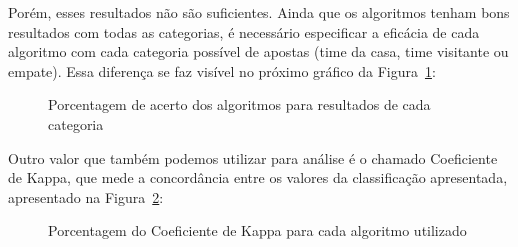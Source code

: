 \documentclass[thesis]{hmcposter}
\begin{document}
\begin{poster}
Porém, esses resultados não são suficientes. Ainda que os algoritmos tenham bons resultados com todas as categorias, é necessário especificar a eficácia de cada algoritmo com cada categoria possível de apostas (time da casa, time visitante ou empate). Essa diferença se faz visível no próximo gráfico da Figura~\ref{fig:algoritmo-categoria}:

\begin{figure}
\begin{center}
\caption{Porcentagem de acerto dos algoritmos para resultados de cada categoria}%
\label{fig:algoritmo-categoria}
\end{center}
\end{figure}

Outro valor que também podemos utilizar para análise é o chamado Coeficiente de Kappa, que mede a concordância entre os valores da classificação apresentada, apresentado na Figura~\ref{fig:algoritmo-kappa}:

\begin{figure}
\begin{center}
\caption{Porcentagem do Coeficiente de Kappa para cada algoritmo utilizado}%
\label{fig:algoritmo-kappa}
\end{center}
\end{figure}


\end{poster}
\end{document}
